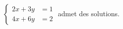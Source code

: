 $\begin{cases}2x+3y &= 1 \\ 4x+6y &= 2\end{cases}$ admet des solutions.

\begin{reponses}
\end{reponses}

